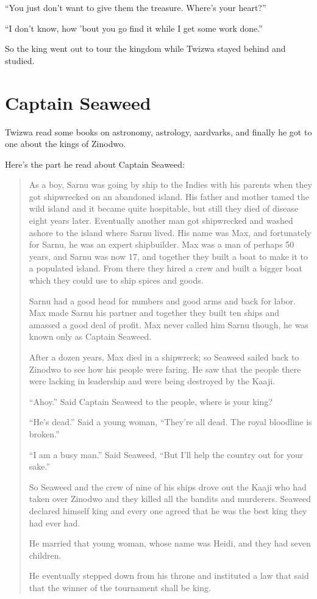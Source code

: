 ``You just don't want to give them the treasure. Where's your heart?''

``I don't know, how 'bout you go find it while I get some work done.''

So the king went out to tour the kingdom while Twizwa stayed behind and studied.

\section{Captain Seaweed}

Twizwa read some books on astronomy, astrology, aardvarks, and finally he got to one about the kings of Zinodwo.

Here's the part he read about Captain Seaweed:

\begin{quote}

As a boy, Sarnu was going by ship to the Indies with his parents when they got shipwrecked on an abandoned island. His father and mother tamed the wild island and it became quite hospitable, but still they died of disease eight years later. Eventually another man got shipwrecked and washed ashore to the island where Sarnu lived. His name was Max, and fortunately for Sarnu, he was an expert shipbuilder. Max was a man of perhaps 50 years, and Sarnu was now 17, and together they built a boat to make it to a populated island. From there they hired a crew and built a bigger boat which they could use to ship spices and goods.

Sarnu had a good head for numbers and good arms and back for labor. Max made Sarnu his partner and together they built ten ships and amassed a good deal of profit. Max never called him Sarnu though, he was known only as Captain Seaweed.

After a dozen years, Max died in a shipwreck; so Seaweed sailed back to Zinodwo to see how his people were faring. He saw that the people there were lacking in leadership and were being destroyed by the Kaaji.

``Ahoy.'' Said Captain Seaweed to the people, where is your king?

``He's dead.'' Said a young woman, ``They're all dead. The royal bloodline is broken.''

``I am a busy man.'' Said Seaweed, ``But I'll help the country out for your sake.''

So Seaweed and the crew of nine of his ships drove out the Kaaji who had taken over Zinodwo and they killed all the bandits and murderers. Seaweed declared himself king and every one agreed that he was the best king they had ever had.

He married that young woman, whose name was Heidi, and they had seven children.

He eventually stepped down from his throne and instituted a law that said that the winner of the tournament shall be king.

\end{quote}

